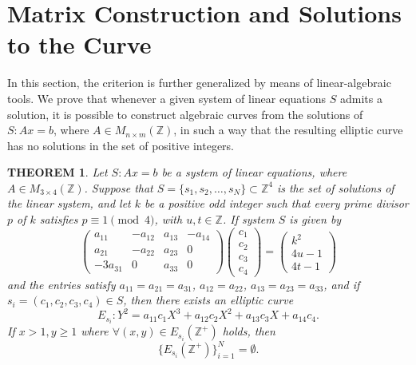 \documentclass[11pt]{amsart}
\newtheorem{theorem}{THEOREM}
\begin{document}
\section{Matrix Construction and Solutions to the Curve}

In this section, the criterion is further generalized by means of linear-algebraic tools. We prove that whenever a given system of linear equations $S$ admits a solution, it is possible to construct algebraic curves from the solutions of $S: Ax=b$, where $A\in M_{n\times m}(\mathbb{Z})$, in such a way that the resulting elliptic curve has no solutions in the set of positive integers.

\begin{theorem}\label{thm9}
Let $S: Ax=b$ be a system of linear equations, where $A\in M_{3\times4}(\mathbb{Z})$. Suppose that $S=\{s_1,s_2,\dots,s_N\}\subset\mathbb{Z}^4$ is the set of solutions of the linear system, and let $k$ be a positive odd integer such that every prime divisor $p$ of $k$ satisfies $p\equiv1\pmod4$, with $u,t\in\mathbb{Z}$. If system $S$ is given by
\[
\begin{pmatrix}
a_{11}&-a_{12}&a_{13}&-a_{14}\\
a_{21}&-a_{22}&a_{23}&0\\
-3a_{31}&0&a_{33}&0
\end{pmatrix}
\begin{pmatrix}c_1\\c_2\\c_3\\c_4\end{pmatrix}
=\begin{pmatrix}k^2\\4u-1\\4t-1\end{pmatrix}
\]
and the entries satisfy $a_{11}=a_{21}=a_{31}$, $a_{12}=a_{22}$, $a_{13}=a_{23}=a_{33}$, and if $s_i=(c_1,c_2,c_3,c_4)\in S$, then there exists an elliptic curve
\[
E_{s_i}: Y^2 = a_{11}c_1X^3+a_{12}c_2X^2+a_{13}c_3X+a_{14}c_4.
\]
If $x>1,y\ge1$ where $\forall(x,y)\in E_{s_i}(\mathbb{Z}^+)$ holds, then
\[
\{E_{s_i}(\mathbb{Z}^+)\}_{i=1}^N = \emptyset.
\]
\end{theorem}
\end{document}
